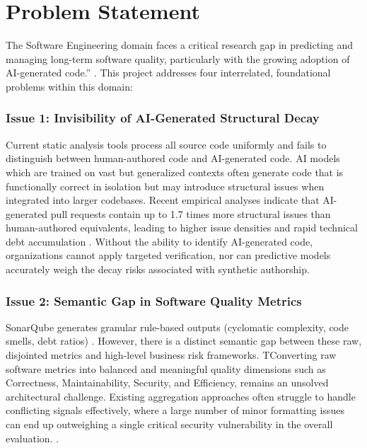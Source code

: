 \section{Problem Statement}

The Software Engineering domain faces a critical research gap in predicting and managing long-term software quality, particularly with the growing adoption of AI-generated code.” \parencite{developers_self_declaration_ai_generated_code}. This project addresses four interrelated, foundational problems within this domain:

\subsubsection*{Issue 1: Invisibility of AI-Generated Structural Decay}

Current static analysis tools process all source code uniformly and fails to distinguish between human-authored code and AI-generated code. AI models which are trained on vast but generalized contexts often generate code that is functionally correct in isolation but may introduce structural issues when integrated into larger codebases. Recent empirical analyses indicate that AI-generated pull requests contain up to 1.7 times more structural issues than human-authored equivalents, leading to higher issue densities and rapid technical debt accumulation \parencite{coderabbit_ai_vs_human_code_generation_report}. Without the ability to identify AI-generated code, organizations cannot apply targeted verification, nor can predictive models accurately weigh the decay risks associated with synthetic authorship.

\subsubsection*{Issue 2: Semantic Gap in Software Quality Metrics}

SonarQube generates granular rule-based outputs (cyclomatic complexity, code smells, debt ratios) \parencite{sonarqube_metrics_definition}. However, there is a distinct semantic gap between these raw, disjointed metrics and high-level business risk frameworks. TConverting raw software metrics into balanced and meaningful quality dimensions such as Correctness, Maintainability, Security, and Efficiency, remains an unsolved architectural challenge. Existing aggregation approaches often struggle to handle conflicting signals effectively, where a large number of minor formatting issues can end up outweighing a single critical security vulnerability in the overall evaluation. \parencite{software_quality_metrics_aggregation_industry}.


